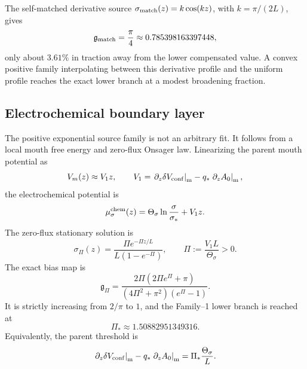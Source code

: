The self-matched derivative source \(\sigma_{\rm match}(z)=k\cos(kz)\), with \(k=\pi/(2L)\), gives
\begin{equation}
\label{eq:part04-g-match}
\mathfrak g_{\rm match}=\frac{\pi}{4}\approx0.785398163397448,
\end{equation}
only about \(3.61\%\) in traction away from the lower compensated value.  A convex positive family interpolating between this derivative profile and the uniform profile reaches the exact lower branch at a modest broadening fraction.

\subsection{Electrochemical boundary layer}
\label{subsec:part04-electrochemical-boundary-layer}

The positive exponential source family is not an arbitrary fit.  It follows from a local mouth free energy and zero-flux Onsager law.  Linearizing the parent mouth potential as
\begin{equation}
\label{eq:part04-V1-def}
V_m(z)\approx V_1z,
\qquad
V_1=\left.\partial_z\delta V_{\rm conf}\right|_{\rm m}-q_*\left.\partial_zA_0\right|_{\rm m},
\end{equation}
the electrochemical potential is
\begin{equation}
\mu_\sigma^{\rm chem}(z)=\Theta_\sigma\ln\frac{\sigma}{\sigma_*}+V_1z.
\end{equation}
The zero-flux stationary solution is
\begin{equation}
\label{eq:part04-sigmaPi}
\sigma_\Pi(z)
=
\frac{\Pi e^{-\Pi z/L}}{L(1-e^{-\Pi})},
\qquad
\Pi:=\frac{V_1L}{\Theta_\sigma}>0.
\end{equation}
The exact bias map is
\begin{equation}
\label{eq:part04-gPi}
\mathfrak g_\Pi
=
\frac{2\Pi(2\Pi e^\Pi+\pi)}{(4\Pi^2+\pi^2)(e^\Pi-1)}.
\end{equation}
It is strictly increasing from \(2/\pi\) to \(1\), and the Family--1 lower branch is reached at
\begin{equation}
\label{eq:part04-Pi-star}
\Pi_*\approx1.50882951349316.
\end{equation}
Equivalently, the parent threshold is
\begin{equation}
\label{eq:part04-parent-mouth-threshold}
\left.\partial_z\delta V_{\rm conf}\right|_{\rm m}
-q_*\left.\partial_zA_0\right|_{\rm m}
=
\Pi_*\frac{\Theta_\sigma}{L}.
\end{equation}

